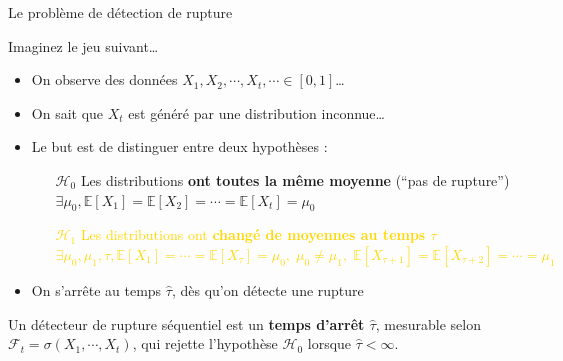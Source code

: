 \documentclass[11pt,french,ignorenonframetext,]{beamer}
\begin{document}
\begin{frame}{Le problème de détection de rupture}

  Imaginez le jeu suivant\ldots

  \begin{itemize}
    \item On observe des données $X_1,X_2,\cdots,X_t,\cdots \in[0,1]$\ldots
    \item On sait que $X_t$ est généré par une distribution \alert{inconnue}\ldots

    \pause
    \item \alert{Le but} est de distinguer entre deux hypothèses :
    \begin{itemize}
      \item[\textcolor{deeppurple}{$\mathcal{H}_0$}] \textcolor{deeppurple}{Les distributions \textbf{ont toutes la même moyenne} \hfill{} (``pas de rupture'')\\
      $\exists \mu_0, \mathbb{E}[X_1] = \mathbb{E}[X_2] = \cdots = \mathbb{E}[X_t] = \mu_0$}

      \item[\textcolor{gold}{$\mathcal{H}_1$}] \textcolor{gold}{Les distributions ont \textbf{changé de moyennes au temps $\tau$} \\
      $\exists \mu_0, \mu_1, \tau, \mathbb{E}[X_1] = \cdots = \mathbb{E}[X_{\tau}] = \mu_0, \; \mu_0 \neq \mu_1, \; \mathbb{E}[X_{\tau+1}] = \mathbb{E}[X_{\tau+2}] = \cdots = \mu_1$}
    \end{itemize}
    \item On s'arrête au temps $\widehat{\tau}$, dès qu'on détecte une rupture
  \end{itemize}

  \pause
  Un \alert{détecteur de rupture séquentiel} est un \alert{\textbf{temps d'arrêt $\widehat{\tau}$}},
  mesurable selon $\mathcal{F}_t = \sigma(X_1,\cdots,X_t)$,
  qui rejette l'hypothèse \textcolor{deeppurple}{$\mathcal{H}_0$}
  lorsque $\widehat{\tau} < \infty$.

\end{frame}
\end{document}
